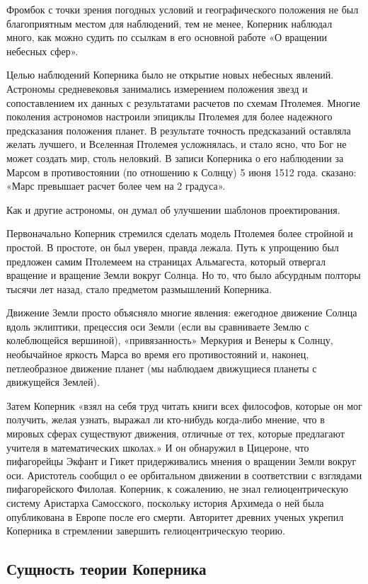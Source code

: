 \documentclass[
]{article}
\begin{document}
Фромбок с точки зрения погодных условий и географического положения не
был благоприятным местом для наблюдений, тем не менее, Коперник наблюдал
много, как можно судить по ссылкам в его основной работе «О вращении
небесных сфер».

Целью наблюдений Коперника было не открытие новых небесных явлений.
Астрономы средневековья занимались измерением положения звезд и
сопоставлением их данных с результатами расчетов по схемам Птолемея.
Многие поколения астрономов настроили эпициклы Птолемея для более
надежного предсказания положения планет. В результате точность
предсказаний оставляла желать лучшего, и Вселенная Птолемея усложнялась,
и стало ясно, что Бог не может создать мир, столь неловкий. В записи
Коперника о его наблюдении за Марсом в противостоянии (по отношению к
Солнцу) 5 июня 1512 года. сказано: «Марс превышает расчет более чем на 2
градуса».

Как и другие астрономы, он думал об улучшении шаблонов проектирования.

Первоначально Коперник стремился сделать модель Птолемея более стройной
и простой. В простоте, он был уверен, правда лежала. Путь к упрощению
был предложен самим Птолемеем на страницах Альмагеста, который отвергал
вращение и вращение Земли вокруг Солнца. Но то, что было абсурдным
полторы тысячи лет назад, стало предметом размышлений Коперника.

Движение Земли просто объясняло многие явления: ежегодное движение
Солнца вдоль эклиптики, прецессия оси Земли (если вы сравниваете Землю с
колеблющейся вершиной), «привязанность» Меркурия и Венеры к Солнцу,
необычайное яркость Марса во время его противостояний и, наконец,
петлеобразное движение планет (мы наблюдаем движущиеся планеты с
движущейся Землей).

Затем Коперник «взял на себя труд читать книги всех философов, которые
он мог получить, желая узнать, выражал ли кто-нибудь когда-либо мнение,
что в мировых сферах существуют движения, отличные от тех, которые
предлагают учителя в математических школах.» И он обнаружил в Цицероне,
что пифагорейцы Экфант и Гикет придерживались мнения о вращении Земли
вокруг оси. Аристотель сообщил о ее орбитальном движении в соответствии
с взглядами пифагорейского Филолая. Коперник, к сожалению, не знал
гелиоцентрическую систему Аристарха Самосского, поскольку история
Архимеда о ней была опубликована в Европе после его смерти. Авторитет
древних ученых укрепил Коперника в стремлении завершить
гелиоцентрическую теорию.

\hypertarget{ux441ux443ux449ux43dux43eux441ux442ux44c-ux442ux435ux43eux440ux438ux438-ux43aux43eux43fux435ux440ux43dux438ux43aux430}{%
\subsection{Сущность теории
Коперника}\label{ux441ux443ux449ux43dux43eux441ux442ux44c-ux442ux435ux43eux440ux438ux438-ux43aux43eux43fux435ux440ux43dux438ux43aux430}}
\end{document}
